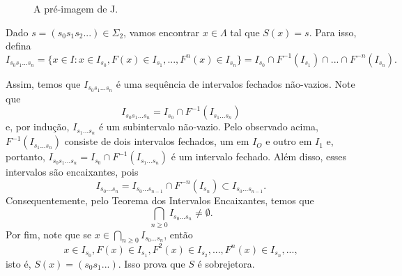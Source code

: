 \documentclass[../IC.tex]{subfiles}
\begin{document}
\begin{prova}
\begin{itemize}
\begin{figure}[H]
				\caption{A pré-imagem de J.}
				\label{preImagemDeJ}
			\end{figure}
			
			Dado $s=(s_0s_1s_2...)\in\Sigma_2$, vamos encontrar $x\in\Lambda$ tal que $S(x)=s$. Para isso, defina
			$$I_{s_0s_1...s_n}=\{x\in I : x \in I_{s_0}, F(x) \in I_{s_1},...,F^n(x) \in I_{s_n}\} = I_{s_0} \cap F^{-1}(I_{s_1}) \cap ... \cap F^{-n}(I_{s_n}).$$
			
			Assim, temos que $I_{s_0s_1...s_n}$ é uma sequência de intervalos fechados não-vazios. Note que
			$$I_{s_0s_1...s_n} = I_{s_0} \cap F^{-1}(I_{s_1...s_n})$$
			e, por indução, $I_{s_1...s_n}$ é um subintervalo não-vazio. Pelo observado acima, $F^{-1}(I_{s_1...s_n})$ consiste de dois intervalos fechados, um em $I_O$ e outro em $I_1$ e, portanto, $I_{s_0s_1...s_n} = I_{s_0} \cap F^{-1}(I_{s_1...s_n})$ é um intervalo fechado. Além disso, esses intervalos são encaixantes, pois 
			$$I_{s_0...s_n} = I_{s_0...s_{n-1}} \cap F^{-n}(I_{s_n}) \subset I_{s_0...s_{n-1}}.$$
			Consequentemente, pelo Teorema dos Intervalos Encaixantes, temos que 
			$$\bigcap_{n \geq 0} I_{s_0...s_n} \neq \emptyset.$$
			Por fim, note que se $x \in \bigcap_{n \geq 0} I_{s_0...s_n}$, então 
			$$x \in I_{s_0}, F(x) \in I_{s_1}, F^2(x) \in I_{s_2}, ..., F^n(x) \in I_{s_n},...,$$
			isto é, $S(x) = (s_0s_1...)$. Isso prova que $S$ é sobrejetora.
			

\end{itemize}
\end{prova}
\end{document}

